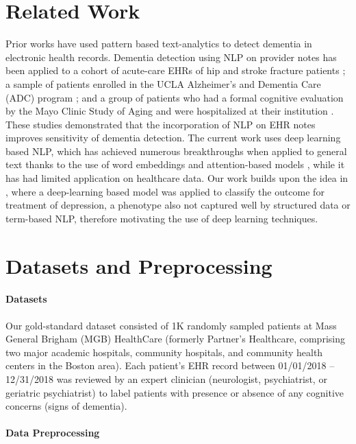 \documentclass[pmlr,twocolumn]{jmlr} %
\begin{document}
\section{Related Work}
\label{sec:relatedwork}
Prior works have used pattern based text-analytics to detect dementia in electronic health records. Dementia detection using NLP on provider notes has been applied to a cohort of acute-care EHRs of hip and stroke fracture patients \citep{gilmore-bykovskyi_unstructured_2018}; a sample of patients enrolled in the UCLA Alzheimer's and Dementia Care (ADC) program \citep{reuben_automated_2017}; and a group of patients who had a formal cognitive evaluation by the Mayo Clinic Study of Aging and were hospitalized at their institution \citep{amra_derivation_2017}. These studies demonstrated that the incorporation of NLP on EHR notes improves sensitivity of dementia detection. The current work uses deep learning based NLP, which has achieved numerous breakthroughs when applied to general text thanks to the use of word embeddings and attention-based models \citep{vaswani2017attention,mikolov2013distributed,pennington2014glove,peters2018deep, devlin2018bert}, while it has had limited application on healthcare data. Our work builds upon the idea in \citep{sheu2019can}, where a deep-learning based model was applied to classify the outcome for treatment of depression, a phenotype also not captured well by structured data or term-based NLP, therefore motivating the use of deep learning techniques.


\section{Datasets and Preprocessing}
\label{sec:dataset_preprocessing}

\paragraph{Datasets}
\label{sec:dataset}Our gold-standard dataset consisted of 1K randomly sampled patients at Mass General Brigham (MGB) HealthCare (formerly Partner’s Healthcare, comprising two major academic hospitals, community hospitals, and community health centers in the Boston area). Each patient’s EHR record between 01/01/2018 – 12/31/2018 was reviewed by an expert clinician (neurologist, psychiatrist, or geriatric psychiatrist) to label patients with presence or absence of any cognitive concerns (signs of dementia).



\paragraph{Data Preprocessing}
\label{sec:preprocessing}
\end{document}
